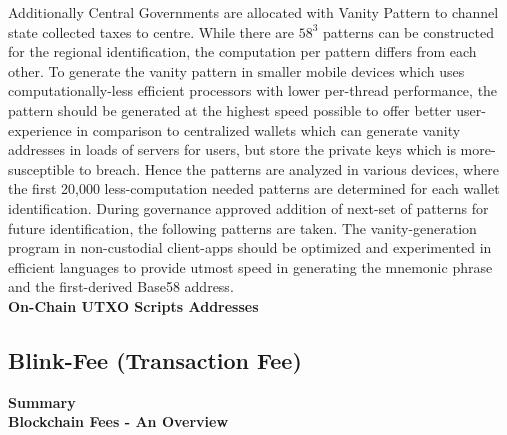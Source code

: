 \documentclass[letterpaper,11pt]{article}
\begin{document}
Additionally Central Governments are allocated with Vanity Pattern to channel state collected taxes to centre. While there are $58^3$ patterns can be constructed for the regional identification, the computation per pattern differs from each other. To generate the vanity pattern in smaller mobile devices which uses computationally-less efficient processors with lower per-thread performance, the pattern should be generated at the highest speed possible to offer better user-experience in comparison to centralized wallets which can generate vanity addresses in loads of servers for users, but store the private keys which is more-susceptible to breach. Hence the patterns are analyzed in various devices, where the first 20,000 less-computation needed patterns are determined for each wallet identification. During governance approved addition of next-set of patterns for future identification, the following patterns are taken. The vanity-generation program in non-custodial client-apps should be optimized and experimented in efficient languages to provide utmost speed in generating the mnemonic phrase and the first-derived Base58 address.\\

\textbf{On-Chain UTXO Scripts Addresses}\\


\subsection{Blink-Fee (Transaction Fee)}

\textbf{Summary}\\




\textbf{Blockchain Fees - An Overview}\\
\end{document}
